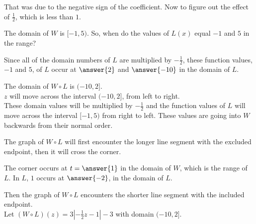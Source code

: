\documentclass{ximera}
\begin{document}
That was due to the negative sign of the coefficient.  Now to figure out the effect of $\frac{1}{2}$, which is less than $1$.


The domain of $W$ is $[-1, 5)$.  So, when do the values of $L(x)$ equal $-1$ and $5$ in the range?  



\begin{question}

Since all of the domain numbers of $L$ are multiplied by $-\frac{1}{2}$, these function values, $-1$ and $5$, of $L$ occur at $\answer{2}$ and $\answer{-10}$ in the domain of $L$. \\

\end{question}


The domain of $W \circ L$ is $(-10, 2]$. \\



$z$ will move across the interval $(-10, 2]$, from left to right.  \\

These domain values will be multiplied by $-\frac{1}{2}$ and the function values of $L$ will move across the interval $[-1, 5)$ from right to left.  These values are going into $W$ backwards from their normal order.

The graph of $W \circ L$ will first encounter the longer line segment with the excluded endpoint, then it will cross the corner.  

\begin{question}

The corner occurs at $ t = \answer{1}$ in the domain of $W$, which is the range of $L$. In $L$, $1$ occurs at $\answer{-2}$, in the domain of $L$.  \\

\end{question}

Then the graph of $W \circ L$ encounters the shorter line segment with the included endpoint. \\





Let $(W \circ L)(z) = 3 |-\frac{1}{2}z-1| - 3$ with domain $(-10, 2]$.
\end{document}
